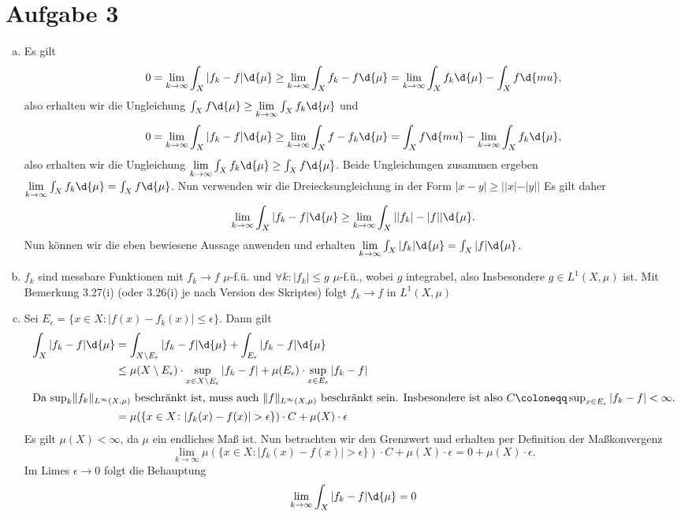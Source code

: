 \documentclass{article}
\newcommand{\norm}[1]{\lVert #1 \rVert}
\begin{document}
    \section*{Aufgabe 3}
    \begin{enumerate}[(a)]
        \item Es gilt 
        \[
            0 = \lim\limits_{k \to \infty} \int_X |f_k-f| \d{\mu} \geq \lim\limits_{k \to \infty} \int_X f_k - f \d{\mu} = \lim\limits_{k \to \infty} \int_X f_k \d{\mu} - \int_X f \d{mu},
        \]
        also erhalten wir die Ungleichung $\int_X f\d{\mu} \geq \lim\limits_{k \to \infty} \int_X f_k \d{\mu}$
        und 
        \[
            0 = \lim\limits_{k \to \infty} \int_X |f_k-f| \d{\mu} \geq \lim\limits_{k \to \infty} \int_X f - f_k \d{\mu} = \int_X f \d{mu}  - \lim\limits_{k \to \infty} \int_X f_k \d{\mu}, 
        \]
        also erhalten wir die Ungleichung $\lim\limits_{k \to \infty} \int_X f_k \d{\mu} \geq \int_X f \d{\mu}$.
        Beide Ungleichungen zusammen ergeben $\lim\limits_{k \to \infty} \int_X f_k \d{\mu} = \int_X f \d{\mu}$.
        Nun verwenden wir die Dreiecksungleichung in der Form $|x-y| \geq ||x| - |y||$
        Es gilt daher
        \[
            \lim\limits_{k \to \infty} \int_X |f_k-f| \d{\mu} \geq \lim\limits_{k \to \infty} \int_X ||f_k|-|f|| \d{\mu}.
        \]
        Nun können wir die eben bewiesene Aussage anwenden und erhalten $\lim\limits_{k \to \infty} \int_X |f_k| \d{\mu} = \int_X |f| \d{\mu}$.
        \item $f_k$ sind messbare Funktionen mit $f_k \to f$ $\mu$-f.ü. und $\forall k\colon |f_k| \leq g$ $\mu$-f.ü., wobei $g$ integrabel, also Insbesondere $g \in L^1(X, \mu)$ ist. Mit Bemerkung 3.27(i) (oder 3.26(i) je nach Version des Skriptes) folgt $f_k \to f$ in $L^1(X, \mu)$
        \item Sei $E_\epsilon = \{x \in X\colon |f(x) - f_k(x)| \leq \epsilon\}$. Dann gilt 
        \begin{align*}
            \int_X |f_k - f| \d{\mu} &= \int_{X\setminus E_\epsilon} |f_k - f| \d{\mu} + \int_{E_\epsilon} |f_k - f| \d{\mu}\\
            &\leq \mu(X \setminus E_\epsilon) \cdot \sup_{x\in X \setminus E_\epsilon} |f_k - f| + \mu(E_\epsilon) \cdot \sup_{x\in E_\epsilon} |f_k -f|\\
            \intertext{Da $\sup_k \norm{f_k}_{L^\infty(X, \mu)}$ beschränkt ist, muss auch $\norm{f}_{L^\infty(X, \mu)}$ beschränkt sein. Insbesondere ist also $C \coloneqq \sup_{x\in E_\epsilon} |f_k -f| < \infty$.}
            &= \mu(\{x \in X\colon |f_k(x) - f(x)| > \epsilon\}) \cdot C + \mu(X) \cdot \epsilon
        \end{align*}
        Es gilt $\mu(X) < \infty$, da $\mu$ ein endliches Maß ist. Nun betrachten wir den Grenzwert und erhalten per Definition der Maßkonvergenz
        \[
            \lim\limits_{k \to \infty} \mu(\{x \in X\colon |f_k(x) - f(x)| > \epsilon\}) \cdot C + \mu(X) \cdot \epsilon = 0 + \mu(X) \cdot \epsilon.
        \]
        Im Limes $\epsilon \to 0$ folgt die Behauptung
        \[
            \lim\limits_{k \to \infty} \int_X |f_k - f| \d{\mu} = 0
        \]
    \end{enumerate}
\end{document}
